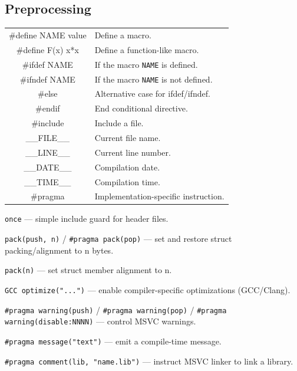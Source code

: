 \documentclass[5pt]{article}
\begin{document}
\begin{multicols}{2}
\subsection{Preprocessing}
\begin{tabular}{C L}
\#define NAME value    & Define a macro.\\
\#define F(x) x*x      & Define a function-like macro.\\
\#ifdef NAME          & If the macro \texttt{NAME} is defined.\\
\#ifndef NAME         & If the macro \texttt{NAME} is not defined.\\
\#else               & Alternative case for ifdef/ifndef.\\
\#endif              & End conditional directive.\\
\#include            & Include a file.\\
\_\_FILE\_\_         & Current file name.\\
\_\_LINE\_\_         & Current line number.\\
\_\_DATE\_\_         & Compilation date.\\
\_\_TIME\_\_         & Compilation time.\\
\#pragma             & Implementation-specific instruction.\\
\end{tabular}
\begin{itemize*}
    \item \texttt{once} — simple include guard for header files.
    \item \texttt{pack(push, n)} / \texttt{\#pragma pack(pop)} — set and restore struct packing/alignment to n bytes.
    \item \texttt{pack(n)} — set struct member alignment to n.
    \item \texttt{GCC optimize("...")} — enable compiler-specific optimizations (GCC/Clang).
    \item \texttt{\#pragma warning(push)} / \texttt{\#pragma warning(pop)} / \texttt{\#pragma warning(disable:NNNN)} — control MSVC warnings.
    \item \texttt{\#pragma message("text")} — emit a compile-time message.
    \item \texttt{\#pragma comment(lib, "name.lib")} — instruct MSVC linker to link a library.
\end{itemize*}


\end{multicols}
\end{document}
